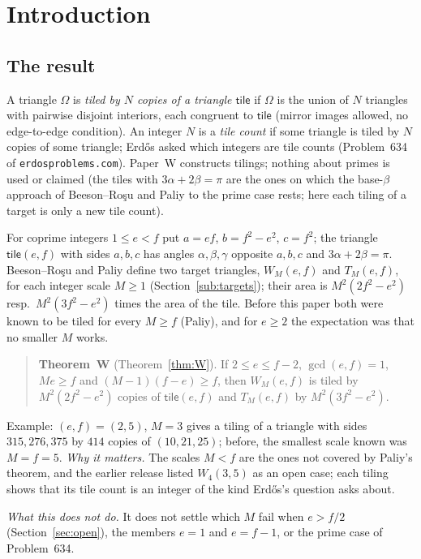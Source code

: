 \documentclass[11pt,reqno]{amsart}
\theoremstyle{plain}
\theoremstyle{definition}
\newcommand{\tile}{\mathsf{tile}}
\begin{document}
\section{Introduction}\label{sec:intro}

\subsection{The result}
A triangle $\Omega$ is \emph{tiled by $N$ copies of a triangle $\tile$} if $\Omega$ is the union of $N$ triangles with pairwise disjoint interiors, each congruent to $\tile$ (mirror images allowed, no edge-to-edge condition).
An integer $N$ is a \emph{tile count} if some triangle is tiled by $N$ copies of some triangle; Erd\H{o}s asked which integers are tile counts (Problem~634 of \texttt{erdosproblems.com}).
Paper~W constructs tilings; nothing about primes is used or claimed (the tiles with $3\alpha+2\beta=\pi$ are the ones on which the base-$\beta$ approach of Beeson--Ro\c{s}u and Paliy to the prime case rests; here each tiling of a target is only a new tile count).

For coprime integers $1\le e<f$ put $a=ef$, $b=f^2-e^2$, $c=f^2$; the triangle $\tile(e,f)$ with sides $a,b,c$ has angles $\alpha,\beta,\gamma$ opposite $a,b,c$ and $3\alpha+2\beta=\pi$.
Beeson--Ro\c{s}u and Paliy define two target triangles, $W_M(e,f)$ and $T_M(e,f)$, for each integer scale $M\ge1$ (Section~\ref{sub:targets}); their area is $M^2(2f^2-e^2)$ resp.\ $M^2(3f^2-e^2)$ times the area of the tile.
Before this paper both were known to be tiled for every $M\ge f$ (Paliy), and for $e\ge2$ the expectation was that no smaller $M$ works.
\begin{quote}
\textbf{Theorem~W} (Theorem~\ref{thm:W}). If $2\le e\le f-2$, $\gcd(e,f)=1$, $Me\ge f$ and $(M-1)(f-e)\ge f$, then $W_M(e,f)$ is tiled by $M^2(2f^2-e^2)$ copies of $\tile(e,f)$ and $T_M(e,f)$ by $M^2(3f^2-e^2)$.
\end{quote}
Example: $(e,f)=(2,5)$, $M=3$ gives a tiling of a triangle with sides $315,276,375$ by $414$ copies of $(10,21,25)$; before, the smallest scale known was $M=f=5$.
\emph{Why it matters.} The scales $M<f$ are the ones not covered by Paliy's theorem, and the earlier release listed $W_4(3,5)$ as an open case; each tiling shows that its tile count is an integer of the kind Erd\H{o}s's question asks about.\par\emph{What this does not do.} It does not settle which $M$ fail when $e>f/2$ (Section~\ref{sec:open}), the members $e=1$ and $e=f-1$, or the prime case of Problem~634.
\end{document}
